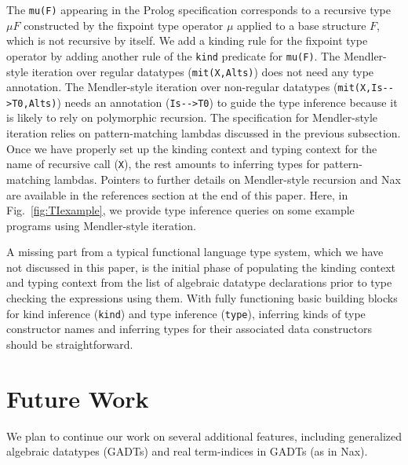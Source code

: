 \documentclass[runningheads,a4paper]{llncs}
\begin{document}
The \verb|mu(F)| appearing in the Prolog specification corresponds to
a recursive type $\mu F$ constructed by the fixpoint type operator $\mu$
applied to a base structure $F$, which is not recursive by itself.
We add a kinding rule for the fixpoint type operator
by adding another rule of the \verb|kind| predicate for \verb|mu(F)|.
The Mendler-style iteration over regular datatypes (\verb|mit(X,Alts)|)
does not need any type annotation. The Mendler-style iteration over
non-regular datatypes (\verb|mit(X,Is-->T0,Alts)|) needs an annotation
(\verb|Is-->T0|) to guide the type inference because it is likely to rely on
polymorphic recursion. The specification for Mendler-style iteration relies
on pattern-matching lambdas discussed in the previous subsection. Once we have
properly set up the kinding context and typing context for the name of
recursive call (\verb|X|), the rest amounts to inferring types for
pattern-matching lambdas. Pointers to further details on Mendler-style
recursion \cite{vene00phd,AbeMatUus03,AhnShe11} and Nax \cite{Ahn14thesis}
are available in the references section at the end of this paper.
Here, in Fig.~\ref{fig:TIexample}, we provide type inference queries on
some example programs using Mendler-style iteration.




A missing part from a typical functional language type system, which
we have not discussed in this paper, is the initial phase of populating
the kinding context and typing context from the list of algebraic datatype
declarations prior to type checking the expressions using them.
With fully functioning basic building blocks for kind inference
(\verb|kind|) and type inference (\verb|type|), inferring kinds of
type constructor names and inferring types for their associated
data constructors should be straightforward.


\section{Future Work}\label{sec:futwork}
We plan to continue our work on several additional features, including
generalized algebraic datatypes (GADTs) and real term-indices
in GADTs (as in Nax). %
\end{document}
